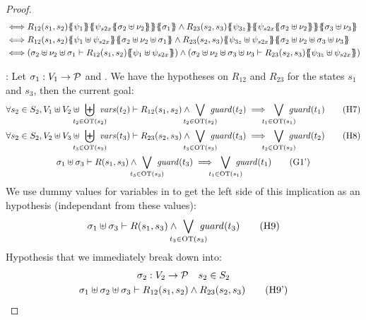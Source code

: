 \documentclass{article}
\begin{document}
\begin{proof}
\begin{align*}
		\iff & R_{12}\mpar{s_1, s_2}\psubst{\psi_1}\psubst{\psi_{s2x}\psubst{\sigma_2 \uplus \nu_2}}\psubst{\sigma_1} \wedge R_{23}\mpar{s_2, s_3}\psubst{\psi_{3z}}\psubst{\psi_{s2x}\psubst{\sigma_2 \uplus \nu_2}}\psubst{\sigma_3 \uplus \nu_3} \\
		\iff & R_{12}\mpar{s_1, s_2}\psubst{\psi_1 \uplus \psi_{s2x}}\psubst{\sigma_2 \uplus \nu_2 \uplus \sigma_1} \wedge R_{23}\mpar{s_2, s_3}\psubst{\psi_{3z} \uplus \psi_{s2x}}\psubst{\sigma_2 \uplus \nu_2 \uplus \sigma_3 \uplus \nu_3} \\
		\iff & \mpar{\sigma_2 \uplus \nu_2 \uplus \sigma_1 \vdash R_{12}\mpar{s_1, s_2}\psubst{\psi_1 \uplus \psi_{s2x}}} \wedge \mpar{\sigma_2 \uplus \nu_2 \uplus \sigma_3 \uplus \nu_3 \vdash R_{23}\mpar{s_2, s_3}\psubst{\psi_{3z} \uplus \psi_{s2x}}}
	\end{align*}
\item[\goal{1}:] Let \(\sigma_1: V_1 \to \mathcal{P}\) and .
	We have the hypotheses on \(R_{12}\) and \(R_{23}\) for the states \(s_1\) and \(s_3\), then the current goal:
	\begin{gather}
		\forall s_2 \in S_2, V_1 \uplus V_2 \uplus \biguplus_\subbox{t_2 \in \fOT{s_2}} \fvars{t_2} \vdash R_{12}\mpar{s_1, s_2} \wedge \bigvee_\subbox{t_2 \in \fOT{s_2}} \fguard{t_2} \implies \bigvee_\subbox{t_1 \in \fOT{s_1}} \fguard{t_1} \hyp{7} \\
		\forall s_2 \in S_2, V_2 \uplus V_3 \uplus \biguplus_\subbox{t_3 \in \fOT{s_3}} \fvars{t_3} \vdash R_{23}\mpar{s_2, s_3} \wedge \bigvee_\subbox{t_3 \in \fOT{s_3}} \fguard{t_3} \implies \bigvee_\subbox{t_2 \in \fOT{s_2}} \fguard{t_2} \hyp{8} \\
		\sigma_1 \uplus \sigma_3 \vdash R\mpar{s_1, s_3} \wedge \bigvee_\subbox{t_3 \in \fOT{s_3}} \fguard{t_3} \implies \bigvee_\subbox{t_1 \in \fOT{s_1}} \fguard{t_1} \goal{1'}
	\end{gather}
	We use dummy values for variables in  to get the left side of this implication as an hypothesis (independant from these values):
	\[ \sigma_1 \uplus \sigma_3 \vdash R\mpar{s_1, s_3} \wedge \bigvee_\subbox{t_3 \in \fOT{s_3}} \fguard{t_3} \hyp{9} \]
	Hypothesis that we immediately break down into:
	\begin{gather*}
		\sigma_2: V_2 \to \values \quad s_2 \in S_2 \\
		\sigma_1 \uplus \sigma_2 \uplus \sigma_3 \vdash R_{12}\mpar{s_1, s_2} \wedge R_{23}\mpar{s_2, s_3} \hyp{9'} \\

\end{gather*}
\end{proof}
\end{document}
